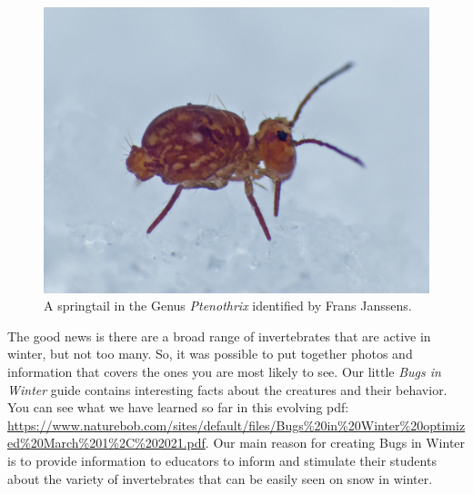 \begin{figure}[H]
\begin{center}
\vspace{2mm}
\includegraphics[width=\textwidth]{img/Ptenothrix.jpg}
\caption{A springtail in the Genus \textit{Ptenothrix} identified by Frans Janssens.}
\label{Ptenothrix}
\end{center}
\end{figure}

The good news is there are a broad range of invertebrates that are active in winter, but not too many. So, it was possible to put together photos and information that covers the ones you are most likely to see. Our little \textit{Bugs in Winter} guide contains interesting facts about the creatures and their behavior. You can see what we have learned so far in this evolving pdf: \url{https://www.naturebob.com/sites/default/files/Bugs%20in%20Winter%20optimized%20March%201%2C%202021.pdf}. Our main reason for creating Bugs in Winter is to provide information to educators to inform and stimulate their students about the variety of invertebrates that can be easily seen on snow in winter. 

